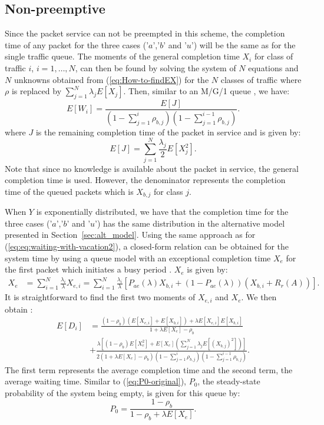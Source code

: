 \documentclass[11pt,journal,oneside,onecolumn,draftclsnofoot]{IEEEtran}
\begin{document}
\subsection{{Non-preemptive}}
\label{sec:non_preempt}

Since the packet service can not be preempted in this scheme, the completion time of any packet for the three cases ('$a$','$b$' and '$u$') will be the same as for the single traffic queue. The moments of the general completion time $X_i$ for class of traffic $i$, $i=1,\dots,N$, can then be found by solving the system of $N$ equations and $N$ unknowns obtained from (\ref{eq:How-to-findEX}) for the $N$ classes of traffic where $\rho$ is replaced by $\sum_{j=1}^{N}{\lambda_j E[X_j]}$.
Then, similar to an M/G/1 queue \cite{bertsekas92}, we have: 
\begin{equation}
E[W_i]=\frac{E[J]}{(1-\sum_{j=1}^{i}{\rho_{b,j}})(1-\sum_{j=1}^{i-1}{\rho_{b,j}})}.
\label{eq:waiting-resume-nonpr}
\end{equation}
where $J$ is the remaining completion time of the packet in service and is given by:
\begin{equation}
E[J]=\sum_{j=1}^{N}{\frac{\lambda_j}{2}E[X_{j}^{2}]}.
\label{eq:}
\end{equation}
Note that since no knowledge is available about the packet in service, the general completion time is used. However, the denominator represents the completion time of the queued packets which is $X_{b,j}$ for class $j$. 

When $Y$ is exponentially distributed, we have that the completion time for the three cases ('$a$','$b$' and '$u$') has the same distribution in the alternative model presented in Section~\ref{sec:alt_model}. Using the same approach as for (\ref{eq:eq:waiting-with-vacation2}), a closed-form relation can be obtained for the system time
by using a queue model with an exceptional completion time $X_e$ for the first packet which initiates a busy period \cite{takagi91}. $X_e$ is given by:
\begin{align}
X_e&=\sum_{i=1}^{N}{\frac{\lambda_i}{\lambda} X_{e,i}}=\sum_{i=1}^{N}{\frac{\lambda_i}{\lambda} \left[P_{ae}(\lambda)X_{b,i}+(1-P_{ae}(\lambda))(X_{b,i}+R_r(A))\right]}.
\label{eq:}
\end{align}
It is straightforward to find the first two moments of $X_{e,i}$ and $X_{e}$. We then obtain \cite{takagi91}:
\begin{align}
E[D_i]&=\frac{(1-{\rho}_b)(E[X_{e,i}]+E[{X_{b,i}}]) + \lambda E[X_{e,i}]E[{X_{b,i}}]}{1+\lambda E[X_e]-{\rho_b}} \nonumber \\
&+\frac{\lambda[(1-{\rho_b})E[X_e^2]+E[X_e](\sum_{j=1}^{N}{{{\lambda}_j}E[({X_{b,j}})^2]})]}{2(1+\lambda E[X_e]-\rho_b){(1-\sum_{j=1}^{i}{\rho_{b,j}})(1-\sum_{j=1}^{i-1}{\rho_{b,j}})}}.
\label{eq:waiting-resume-nonpr-Ex}
\end{align}
The first term represents the average completion time and the second term, the average waiting time. 
Similar to (\ref{eq:P0-original}), $P_0$, the steady-state probability of the system being empty, is given for this queue by:
\begin{equation}
P_0= \frac{1-\rho_b}{1-\rho_b+\lambda E[X_e]}.
\label{eq:P0-nonpr}
\end{equation}
\end{document}
